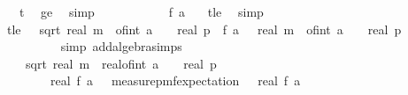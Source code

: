\begin{isabellebody}
\ {\isachardoublequoteopen}{\isachardot}{\kern0pt}{\isachardot}{\kern0pt}{\isachardot}{\kern0pt}\ {\isasymle}\ t{\isachardoublequoteclose}\ \isamarkupfalse%
\ {\isasymdelta}{\isacharprime}{\kern0pt}{\isacharunderscore}{\kern0pt}ge{\isacharunderscore}{\kern0pt}{}\ \isamarkupfalse%
\ simp\isanewline
\ \ \ \ \ \ \isamarkupfalse%
\ \isamarkupfalse%
\ {\isachardoublequoteopen}{\isachardot}{\kern0pt}{\isachardot}{\kern0pt}{\isachardot}{\kern0pt}\ {\isasymle}\ f\ a\ {\isasymomega}{\isachardoublequoteclose}\ \isamarkupfalse%
\ t{\isacharunderscore}{\kern0pt}le\ \isamarkupfalse%
\ simp\isanewline
\ \ \ \ \ \ \isamarkupfalse%
\ \isamarkupfalse%
\ t{\isacharunderscore}{\kern0pt}le{\isacharcolon}{\kern0pt}\ {\isachardoublequoteopen}{}\ {\isacharasterisk}{\kern0pt}\ sqrt\ {\isacharparenleft}{\kern0pt}real\ m\ {\isacharasterisk}{\kern0pt}\ {\isacharparenleft}{\kern0pt}of{\isacharunderscore}{\kern0pt}int\ a\ {\isacharplus}{\kern0pt}\ {}{\isacharparenright}{\kern0pt}\ {\isacharslash}{\kern0pt}\ real\ p{\isacharparenright}{\kern0pt}\ {\isasymle}\ f\ a\ {\isasymomega}\ {\isacharminus}{\kern0pt}\ real\ m\ {\isacharasterisk}{\kern0pt}\ {\isacharparenleft}{\kern0pt}of{\isacharunderscore}{\kern0pt}int\ a\ {\isacharplus}{\kern0pt}\ {}{\isacharparenright}{\kern0pt}\ {\isacharslash}{\kern0pt}\ real\ p{\isachardoublequoteclose}\isanewline
\ \ \ \ \ \ \ \ \isamarkupfalse%
\ {\isacharparenleft}{\kern0pt}simp\ add{\isacharcolon}{\kern0pt}algebra{\isacharunderscore}{\kern0pt}simps{\isacharparenright}{\kern0pt}\isanewline
\ \ \ \ \ \ \isamarkupfalse%
\ {\isachardoublequoteopen}\ {}\ {\isacharasterisk}{\kern0pt}\ sqrt\ {\isacharparenleft}{\kern0pt}real\ m\ {\isacharasterisk}{\kern0pt}\ {\isacharparenleft}{\kern0pt}real{\isacharunderscore}{\kern0pt}of{\isacharunderscore}{\kern0pt}int\ a\ {\isacharplus}{\kern0pt}\ {}{\isacharparenright}{\kern0pt}\ {\isacharslash}{\kern0pt}\ real\ p{\isacharparenright}{\kern0pt}\ {\isasymle}\ \isanewline
\ \ \ \ \ \ \ \ {\isasymbar}real\ {\isacharparenleft}{\kern0pt}f\ a\ {\isasymomega}{\isacharparenright}{\kern0pt}\ {\isacharminus}{\kern0pt}\ measure{\isacharunderscore}{\kern0pt}pmf{\isachardot}{\kern0pt}expectation\ {\isasymOmega}\ {\isacharparenleft}{\kern0pt}{\isasymlambda}{\isasymomega}{\isachardot}{\kern0pt}\ real\ {\isacharparenleft}{\kern0pt}f\ a\ {\isasymomega}{\isacharparenright}{\kern0pt}{\isacharparenright}{\kern0pt}{\isasymbar}{\isachardoublequoteclose}\isanewline

\end{isabellebody}
